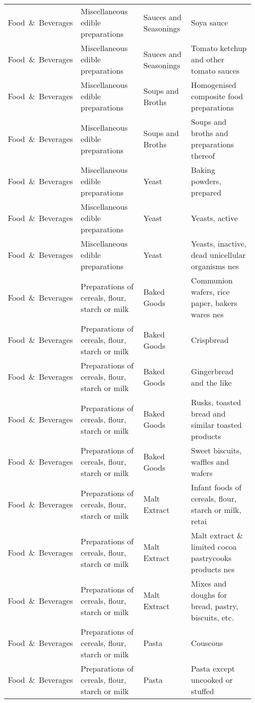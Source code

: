 \begin{appendices}
\begin{xltabular}{\textwidth}{|p{0.10\textwidth}|p{0.30\textwidth}|p{0.20\textwidth}|p{0.30\textwidth}|}
		Food\ \&\ Beverages & Miscellaneous edible preparations & Sauces and Seasonings & Soya sauce \\
		Food\ \&\ Beverages & Miscellaneous edible preparations & Sauces and Seasonings & Tomato ketchup and other tomato sauces \\
		Food\ \&\ Beverages & Miscellaneous edible preparations & Soups and Broths & Homogenised composite food preparations \\
		Food\ \&\ Beverages & Miscellaneous edible preparations & Soups and Broths & Soups and broths and preparations thereof \\
		Food\ \&\ Beverages & Miscellaneous edible preparations & Yeast & Baking powders, prepared \\
		Food\ \&\ Beverages & Miscellaneous edible preparations & Yeast & Yeasts, active \\
		Food\ \&\ Beverages & Miscellaneous edible preparations & Yeast & Yeasts, inactive, dead unicellular organisms nes \\
		Food\ \&\ Beverages & Preparations of cereals, flour, starch or milk & Baked Goods & Communion wafers, rice paper, bakers wares nes \\
		Food\ \&\ Beverages & Preparations of cereals, flour, starch or milk & Baked Goods & Crispbread \\
		Food\ \&\ Beverages & Preparations of cereals, flour, starch or milk & Baked Goods & Gingerbread and the like \\
		Food\ \&\ Beverages & Preparations of cereals, flour, starch or milk & Baked Goods & Rusks, toasted bread and similar toasted products \\
		Food\ \&\ Beverages & Preparations of cereals, flour, starch or milk & Baked Goods & Sweet biscuits, waffles and wafers \\
		Food\ \&\ Beverages & Preparations of cereals, flour, starch or milk & Malt Extract & Infant foods of cereals, flour, starch or milk, retai \\
		Food\ \&\ Beverages & Preparations of cereals, flour, starch or milk & Malt Extract & Malt extract \& limited cocoa pastrycooks products nes \\
		Food\ \&\ Beverages & Preparations of cereals, flour, starch or milk & Malt Extract & Mixes and doughs for bread, pastry, biscuits, etc. \\
		Food\ \&\ Beverages & Preparations of cereals, flour, starch or milk & Pasta & Couscous \\
		Food\ \&\ Beverages & Preparations of cereals, flour, starch or milk & Pasta & Pasta except uncooked or stuffed \\

\end{xltabular}
\end{appendices}
